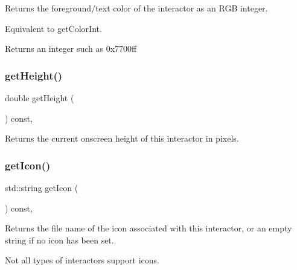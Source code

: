 Returns the foreground/text color of the interactor as an R\+GB integer. 

Equivalent to get\+Color\+Int. \begin{DoxyReturn}{Returns}
an integer such as 0x7700ff 
\end{DoxyReturn}
\mbox{\label{classsgl_1_1GInteractor_a1e7e353362434072875264cf95629f99}} 
\subsubsection{\texorpdfstring{get\+Height()}{getHeight()}}
{\footnotesize\ttfamily double get\+Height (\begin{DoxyParamCaption}{ }\end{DoxyParamCaption}) const\hspace{0.3cm}{\ttfamily [virtual]}, {\ttfamily [inherited]}}



Returns the current onscreen height of this interactor in pixels. 

\mbox{\label{classsgl_1_1GInteractor_aaed62a73004939a64da6f0eb9eb64d73}} 
\subsubsection{\texorpdfstring{get\+Icon()}{getIcon()}}
{\footnotesize\ttfamily std\+::string get\+Icon (\begin{DoxyParamCaption}{ }\end{DoxyParamCaption}) const\hspace{0.3cm}{\ttfamily [virtual]}, {\ttfamily [inherited]}}



Returns the file name of the icon associated with this interactor, or an empty string if no icon has been set. 

Not all types of interactors support icons. \mbox{\label{classsgl_1_1GInteractor_a9c9659a6c6ba66b4107ba59c95a24241}} 

